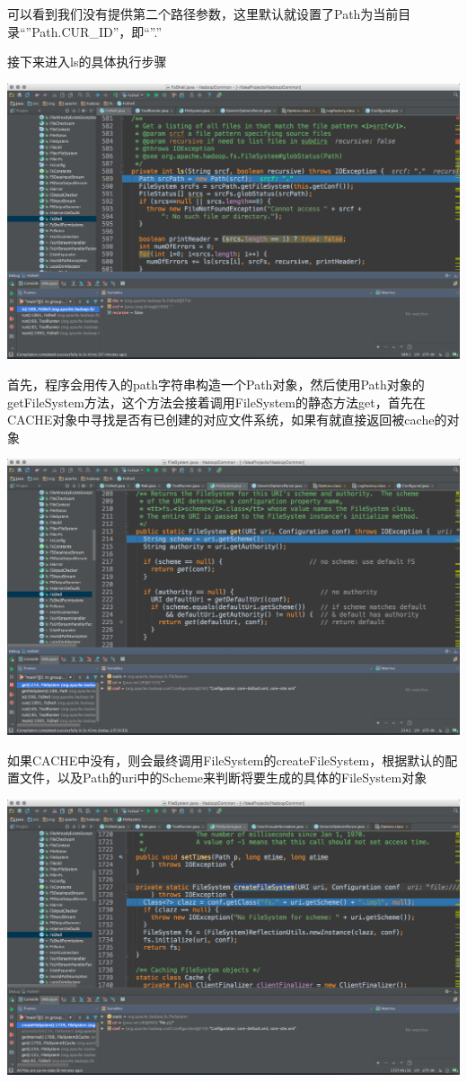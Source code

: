 可以看到我们没有提供第二个路径参数，这里默认就设置了Path为当前目录``''Path.CUR_ID''，即``''.''

接下来进入ls的具体执行步骤

\includegraphics[width=\textwidth]{image/env/cr37.png}

首先，程序会用传入的path字符串构造一个Path对象，然后使用Path对象的getFileSystem方法，这个方法会接着调用FileSystem的静态方法get，首先在CACHE对象中寻找是否有已创建的对应文件系统，如果有就直接返回被cache的对象

\includegraphics[width=\textwidth]{image/env/cr38.png}

如果CACHE中没有，则会最终调用FileSystem的createFileSystem，根据默认的配置文件，以及Path的uri中的Scheme来判断将要生成的具体的FileSystem对象

\includegraphics[width=\textwidth]{image/env/cr39.png}

